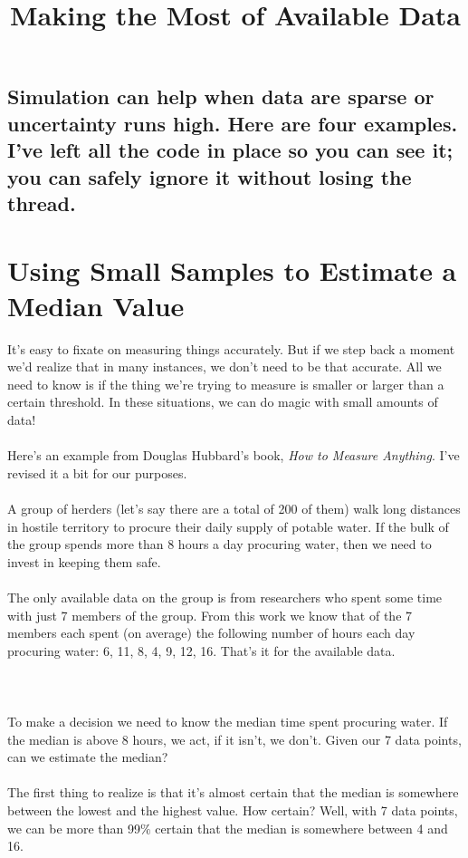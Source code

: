 \documentclass{article}
\begin{document}
\title{Making the Most of Available Data}
\author{}
\date{}
\maketitle

\subsection*{Simulation can help when data are sparse or uncertainty runs high. Here are four examples. I{'}ve left all the code in place so you
can see it; you can safely ignore it without losing the thread.}

\section*{Using Small Samples to Estimate a Median Value}

It{'}s easy to fixate on measuring things accurately. But if we step back a moment we{'}d realize that in many instances, we don{'}t need to be that
accurate. All we need to know is if the thing we{'}re trying to measure is smaller or larger than a certain threshold. In these situations, we can
do magic with small amounts of data! \\
\\
Here{'}s an example from Douglas Hubbard{'}s book, \textit{ How to Measure Anything}. I{'}ve revised it a bit for our purposes.\\
\\
A group of herders (let{'}s say there are a total of 200 of them) walk long distances in hostile territory to procure their daily supply of potable
water. If the bulk of the group spends more than 8 hours a day procuring water, then we need to invest in keeping them safe. \\
\\
The only available data on the group is from researchers who spent some time with just 7 members of the group. From this work we know that { }of
the 7 members each spent (on average) the following number of hours each day procuring water: 6, 11, 8, 4, 9, 12, 16. That{'}s it for the available
data.\\
\\
\\
\\
To make a decision we need to know the median time spent procuring water. If the median is above 8 hours, we act, if it isn{'}t, we don{'}t. Given
our 7 data points, can we estimate the median? \\
\\
The first thing to realize is that it{'}s almost certain that the median is somewhere between the lowest and the highest value. How certain? Well,
with 7 data points, we can be more than 99$\%$ certain that the median is somewhere between 4 and 16.
\end{document}
